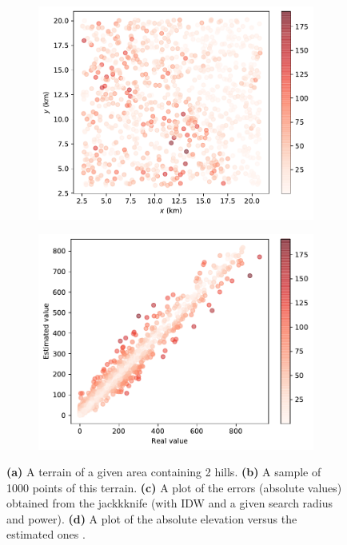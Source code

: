 \begin{figure}
\begin{subfigure}[b]{0.475\linewidth}
    \caption{}
  \end{subfigure}
  \begin{subfigure}[b]{0.45\linewidth}
    \centering
    \includegraphics[width=\textwidth]{figs/jackknife/jk3.pdf}
    \caption{}
  \end{subfigure}
  \quad
  \begin{subfigure}[b]{0.45\linewidth}
    \centering
    \includegraphics[width=\textwidth]{figs/jackknife/jk4.pdf}
    \caption{}
  \end{subfigure}
\caption{\textbf{(a)} A terrain of a given area containing 2 hills. \textbf{(b)} A sample of 1000 points of this terrain. \textbf{(c)} A plot of the errors (absolute values) obtained from the jackkknife (with IDW and a given search radius and power). \textbf{(d)} A plot of the absolute elevation versus the estimated ones .}
\label{fig:jackknife}
\end{figure}
